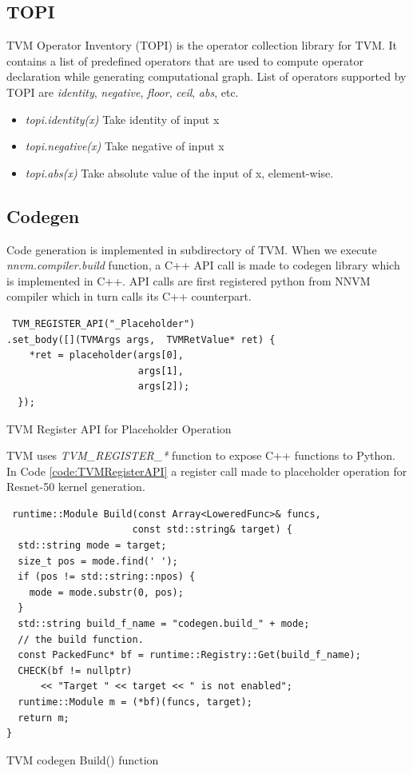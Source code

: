  \subsection{TOPI}
 TVM Operator Inventory (TOPI) is the operator collection library for TVM. It contains a list of predefined operators that are used to compute operator declaration while generating computational graph. List of operators supported by TOPI are \textit{identity}, \textit{negative}, \textit{floor}, \textit{ceil}, \textit{abs}, etc.
 \begin{itemize}
\item \textit{topi.identity(x)} Take identity of input x
\item \textit{topi.negative(x)} Take negative of input x
\item \textit{topi.abs(x)}  Take absolute value of the input of x, element-wise.
 \end{itemize}
 
 \subsection{Codegen}
 Code generation is implemented in  subdirectory of TVM. When we execute \textit{nnvm.compiler.build} function, a C++ API call is made to codegen library which is implemented in C++. API calls are first registered python  from NNVM compiler which in turn calls  its C++ counterpart.
 
  \begin{code}[!htb]
 \begin{verbatim}
 TVM_REGISTER_API("_Placeholder")
.set_body([](TVMArgs args,  TVMRetValue* ret) {
    *ret = placeholder(args[0],
                       args[1],
                       args[2]);
  });
 \end{verbatim}
\caption{TVM Register API for Placeholder Operation}
\label{code:TVMRegisterAPI}
\end{code}
TVM uses \textit{TVM\_REGISTER\_*} function to expose C++ functions to Python. In Code \ref{code:TVMRegisterAPI} a register call made to placeholder operation for Resnet-50 kernel generation.
 
 \begin{code}[!htb]
 \begin{verbatim}
 runtime::Module Build(const Array<LoweredFunc>& funcs,
                      const std::string& target) {
  std::string mode = target;
  size_t pos = mode.find(' ');
  if (pos != std::string::npos) {
    mode = mode.substr(0, pos);
  }
  std::string build_f_name = "codegen.build_" + mode;
  // the build function.
  const PackedFunc* bf = runtime::Registry::Get(build_f_name);
  CHECK(bf != nullptr)
      << "Target " << target << " is not enabled";
  runtime::Module m = (*bf)(funcs, target);
  return m;
}
\end{verbatim}
\caption{TVM codegen Build() function}
\label{code:TVMCodegen}
\end{code}

